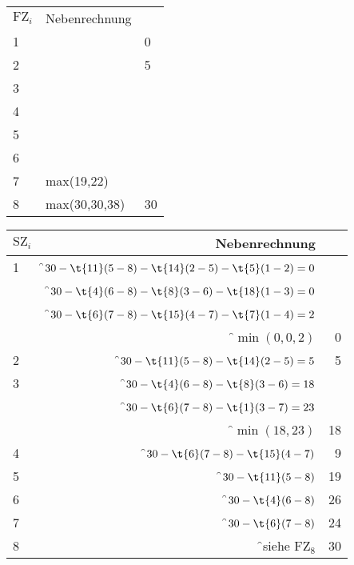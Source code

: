 \documentclass{lehramt-informatik}
\begin{document}
\bigskip

\begin{tabular}{|l|l|l|}
$\text{FZ}_i$ & Nebenrechnung & \\
1             &  & 0 \\
2             & & 5 \\
3             & & \\
4             & & \\
5             &  & \\
6             & & \\
7             & max(19,22) & \\
8             & max(30,30,38) & 30 \\
\end{tabular}

\bigskip

\begin{tabular}{|l|r|r|}
\hline
$\text{SZ}_i$ & Nebenrechnung & \\
\hline\hline
1             & \f$30 - \t{11}(5-8) - \t{14}(2-5) -\t{5}(1-2) = 0$ & \\
              & \f$30 - \t{4}(6-8) - \t{8}(3-6) - \t{18}(1-3) = 0$ & \\
              & \f$30 - \t{6}(7-8) - \t{15}(4-7) - \t{7}(1-4) = 2$ & \\
              & \f$\min(0,0,2)$ & 0 \\\hline

2             & \f$30 - \t{11}(5-8) - \t{14}(2-5) = 5$ & 5 \\\hline
3             & \f$30 - \t{4}(6-8) - \t{8}(3-6) = 18$  & \\
              & \f$30 - \t{6}(7-8) - \t{1}(3-7) = 23$  & \\
              & \f$\min(18,23)$                        & 18 \\\hline

4             & \f$30 - \t{6}(7-8) - \t{15}(4-7)$      & 9 \\\hline
5             & \f$30 - \t{11}(5-8)$                   & 19 \\\hline
6             & \f$30 - \t{4}(6-8)$                    & 26 \\\hline
7             & \f$30 - \t{6}(7-8)$                    & 24 \\\hline
8             & \f{}siehe $\text{FZ}_8$                & 30 \\\hline
\end{tabular}

\end{document}

